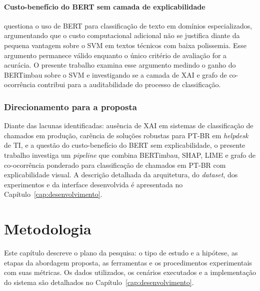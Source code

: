 \documentclass[
    12pt,                %
    openright,           %
    oneside,             %
    a4paper,             %
    english,             %
    brazil               %
]{abntex2}
\begin{document}
\subsubsection{Custo-benefício do BERT sem camada de explicabilidade}
\label{subsubsec:lacuna_wahba}

 questiona o uso de BERT para classificação de texto em domínios especializados, 
argumentando que o custo computacional adicional não se justifica diante da pequena vantagem sobre 
o SVM em textos técnicos com baixa polissemia. Esse argumento permanece válido enquanto o único critério 
de avaliação for a acurácia. O presente trabalho examina esse argumento medindo o ganho do BERTimbau sobre o SVM e investigando se a camada de XAI e grafo de co-ocorrência contribui para a auditabilidade do processo de classificação.

\subsection{Direcionamento para a proposta}
\label{subsec:sintese_direcao}

Diante das lacunas identificadas: ausência de XAI em sistemas de classificação de chamados em produção, carência de soluções robustas para PT-BR em \textit{helpdesk} de TI, e a questão do custo-benefício do BERT sem explicabilidade, o presente trabalho investiga um \textit{pipeline} que combina BERTimbau, SHAP, LIME e grafo de co-ocorrência ponderado para classificação de chamados em PT-BR com explicabilidade visual. A descrição detalhada da arquitetura, do \textit{dataset}, dos experimentos e da interface desenvolvida é apresentada no Capítulo~\ref{cap:desenvolvimento}.

\chapter{Metodologia}
\label{cap:metodologia}
Este capítulo descreve o plano da pesquisa: o tipo de estudo e a hipótese, as etapas da abordagem proposta, as ferramentas e os procedimentos experimentais com suas métricas. Os dados utilizados, os cenários executados e a implementação do sistema são detalhados no Capítulo~\ref{cap:desenvolvimento}.
\end{document}

